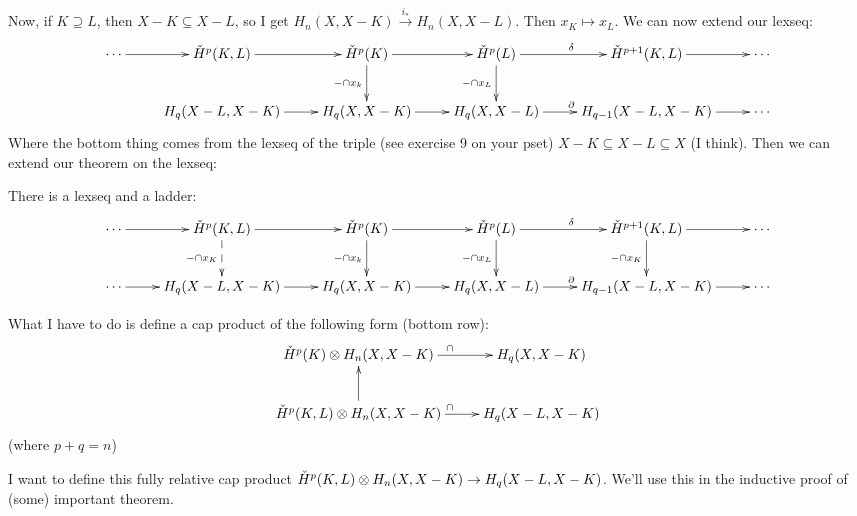 Now, if $K\supseteq L$, then $X-K\subseteq X-L$, so I get $H_n(X,X-K)\xrightarrow{i_\ast} H_n(X,X-L)$. Then $x_K\mapsto x_L$. We can now extend our lexseq:
\begin{equation*}
\xymatrix{
	\cdots\ar[r] & \cHH^p(K,L)\ar[r] & \cHH^p(K)\ar[r]\ar[d]_{-\cap x_k} & \cHH^p(L)\ar[r]^\delta\ar[d]_{-\cap x_L} & \cHH^{p+1}(K,L)\ar[r] & \cdots\\
	& H_q(X-L,X-K)\ar[r]& H_q(X,X-K)\ar[r] & H_q(X,X-L)\ar[r]^\partial & H_{q-1}(X-L,X-K)\ar[r] & \cdots
}
\end{equation*}
Where the bottom thing comes from the lexseq of the triple (see exercise 9 on your pset) $X-K\subseteq X-L\subseteq X$ (I think). Then we can extend our theorem on the lexseq:
\begin{theorem}
There is a lexseq and a ladder:
\begin{equation*}
\xymatrix{
	\cdots\ar[r] & \cHH^p(K,L)\ar[r]\ar@{-->}[d]_{-\cap x_{K}} & \cHH^p(K)\ar[r]\ar[d]_{-\cap x_k} & \cHH^p(L)\ar[r]^\delta\ar[d]_{-\cap x_L} & \cHH^{p+1}(K,L)\ar[r]\ar[d]_{-\cap x_{K}} & \cdots\\
	\cdots\ar[r] & H_q(X-L,X-K)\ar[r]& H_q(X,X-K)\ar[r] & H_q(X,X-L)\ar[r]^\partial & H_{q-1}(X-L,X-K)\ar[r] & \cdots
}
\end{equation*}
\end{theorem}
What I have to do is define a cap product of the following form (bottom row):
\begin{equation*}
\xymatrix{
	\cHH^p(K)\otimes H_n(X,X-K)\ar[r]^{\cap} & H_q(X,X-K)\\
	\cHH^p(K,L)\otimes H_n(X,X-K)\ar[u]\ar[r]^{\cap} & H_q(X-L,X-K)
}
\end{equation*}
(where $p+q=n$)

I want to define this fully relative cap product $\check{H}^p(K,L)\otimes H_n(X,X-K)\to H_q(X-L,X-K)$. We'll use this in the inductive proof of (some) important theorem.

